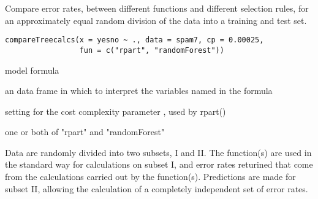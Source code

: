 \begin{Description}\relax
Compare error rates, between different functions and different
selection rules, for an approximately equal random division of the
data into a training and test set.
\end{Description}
\begin{Usage}
\begin{verbatim}
compareTreecalcs(x = yesno ~ ., data = spam7, cp = 0.00025,
                 fun = c("rpart", "randomForest"))
\end{verbatim}
\end{Usage}
\begin{Arguments}
\begin{ldescription}
\item[\code{x}] model formula
\item[\code{data}] an data frame in which to interpret the variables
named in the formula
\item[\code{cp}] setting for the cost complexity parameter ,
used by rpart()
\item[\code{fun}] one or both of "rpart" and "randomForest"
\end{ldescription}
\end{Arguments}
\begin{Details}\relax
Data are randomly divided into two subsets, I and II. The function(s)
are used in the standard way for calculations on subset I, and error
rates returined that come from the calculations carried out by the
function(s).  Predictions are made for subset II, allowing the
calculation of a completely independent set of error rates.
\end{Details}
